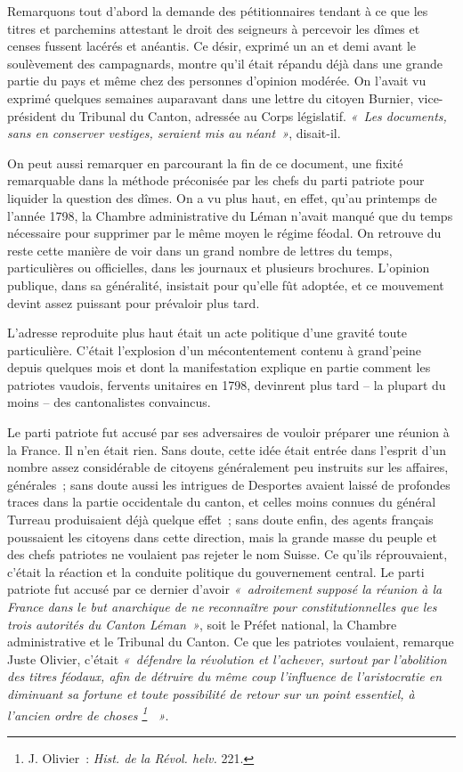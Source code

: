 \documentclass[french,twoside]{book} %
\begin{document}
\noindent Remarquons tout d’abord la demande des pétitionnaires tendant à ce que les titres et parchemins attestant le droit des seigneurs à percevoir les dîmes et censes fussent lacérés et anéantis. Ce désir, exprimé un an et demi avant le soulèvement des campagnards, montre qu’il était répandu déjà dans une grande partie du pays et même chez des personnes d’opinion modérée. On l’avait vu exprimé quelques semaines auparavant dans une lettre du citoyen Burnier, vice-président du Tribunal du Canton, adressée au Corps législatif. \emph{« Les documents, sans en conserver vestiges, seraient mis au néant »}, disait-il.\par
On peut aussi remarquer en parcourant la fin de ce document, une fixité remarquable dans la méthode préconisée par les chefs du parti patriote pour liquider la question des dîmes. On a vu plus haut, en effet, qu’au printemps de l’année 1798, la Chambre administrative du Léman n’avait manqué que du temps nécessaire pour supprimer par le même moyen le régime féodal. On retrouve du reste cette manière de voir dans un grand nombre de lettres du temps, particulières ou officielles, dans les journaux et plusieurs brochures. L’opinion publique, dans sa généralité, insistait pour qu’elle fût adoptée, et ce mouvement devint assez puissant pour prévaloir plus tard.\par
L’adresse reproduite plus haut était un acte politique d’une gravité toute particulière. C’était l’explosion d’un mécontentement contenu à grand’peine depuis quelques mois et dont la manifestation explique en partie comment les patriotes vaudois, fervents unitaires en 1798, devinrent plus tard – la plupart du moins – des cantonalistes convaincus.\par
Le parti patriote fut accusé par ses adversaires de vouloir préparer une réunion à la France. Il n’en était rien. Sans doute, cette idée était entrée dans l’esprit d’un nombre assez considérable de citoyens généralement peu instruits sur les affaires, générales ; sans doute aussi les intrigues de Desportes avaient laissé de profondes traces dans la partie occidentale du canton, et celles moins connues du général Turreau produisaient déjà quelque effet ; sans doute enfin, des agents français poussaient les citoyens dans cette direction, mais la grande masse du peuple et des chefs patriotes ne voulaient pas rejeter le nom Suisse. Ce qu’ils réprouvaient, c’était la réaction et la conduite politique du gouvernement central. Le parti patriote fut accusé par ce dernier d’avoir \emph{« adroitement supposé la réunion à la France dans le but anarchique de ne reconnaître pour constitutionnelles que les trois autorités du Canton Léman »}, soit le Préfet national, la Chambre administrative et le Tribunal du Canton. Ce que les patriotes voulaient, remarque Juste Olivier, c’était \emph{« défendre la révolution et l’achever, surtout par l’abolition des titres féodaux, afin de détruire du même coup l’influence de l’aristocratie en diminuant sa fortune et toute possibilité de retour sur un point essentiel, à l’ancien ordre de choses \footnote{J. Olivier : \emph{Hist. de la Révol. helv.} 221.}  »}.\par
\end{document}
